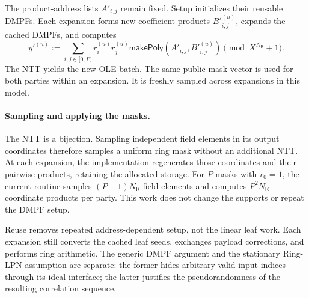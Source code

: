 The product-address lists $A'_{i,j}$ remain fixed.
Setup initializes their reusable DMPFs.
Each expansion forms new coefficient products $B'^{(u)}_{i,j}$, expands the
cached DMPFs, and computes
\[
 y'^{(u)}:=
 \sum_{i,j\in[0,P)}r_i^{(u)}r_j^{(u)}
 \mathsf{makePoly}(A'_{i,j},B'^{(u)}_{i,j})
 \pmod{X^{N_{\mathsf R}}+1}.
\]
The NTT yields the new OLE batch.
The same public mask vector is used for both parties within an expansion.
It is freshly sampled across expansions in this model.

\paragraph{Sampling and applying the masks.}
The NTT is a bijection. Sampling independent field elements in its output
coordinates therefore samples a uniform ring mask without an additional NTT.
At each expansion, the implementation regenerates those coordinates and
their pairwise products, retaining the allocated storage.
For $P$ masks with $r_0=1$, the current routine samples $(P-1)N_{\mathsf R}$
field elements and computes $P^2N_{\mathsf R}$ coordinate products per party.
This work does not change the supports or repeat the DMPF setup.

Reuse removes repeated address-dependent setup, not the linear leaf work.
Each expansion still converts the cached leaf seeds, exchanges payload
corrections, and performs ring arithmetic.
The generic DMPF argument and the stationary Ring-LPN assumption are separate:
the former hides arbitrary valid input indices through its ideal interface;
the latter justifies the pseudorandomness of the resulting correlation
sequence.
